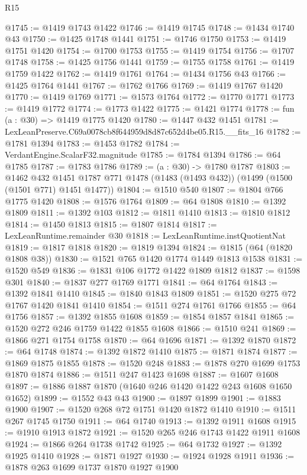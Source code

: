 \begin{lexlean}{R15}
\begin{coremodule}
@1745 := @1419 @1743 @1422
@1746 := @1419 @1745
@1748 := @1434 @1740 @43
@1750 := @1425 @1748 @1441
@1751 := @1746 @1750
@1753 := @1419 @1751 @1420
@1754 := @1700 @1753
@1755 := @1419 @1754
@1756 := @1707 @1748
@1758 := @1425 @1756 @1441
@1759 := @1755 @1758
@1761 := @1419 @1759 @1422
@1762 := @1419 @1761
@1764 := @1434 @1756 @43
@1766 := @1425 @1764 @1441
@1767 := @1762 @1766
@1769 := @1419 @1767 @1420
@1770 := @1419 @1769
@1771 := @1573 @1764
@1772 := @1770 @1771
@1773 := @1419 @1772
@1774 := @1773 @1422
@1775 := @1421 @1774
@1778 := fun (a : @30) => @1419 @1775 @1420
@1780 := @1447 @432 @1451
@1781 := LexLeanPreserve.C69a0078cb8f644959d8d87c652d4be05.R15.__fits_16
@1782 := @1781 @1394
@1783 := @1453 @1782
@1784 := VerdantEngine.ScalarF32.magnitude
@1785 := @1784 @1394
@1786 := @64 @1785
@1787 := @1783 @1786
@1789 := (a : @30) -> @1780 @1787
@1803 := @1462
    @432
    @1451
    @1787
    @771
    @1478
    (@1483 (@1493 @432))
    (@1499 (@1500 (@1501 @771) @1451 @1477))
@1804 := @1510 @540
@1807 := @1804 @766 @1775 @1420
@1808 := @1576 @1764
@1809 := @64 @1808
@1810 := @1392 @1809
@1811 := @1392 @103
@1812 := @1811 @1410
@1813 := @1810 @1812
@1814 := @1450 @1813
@1815 := @1807 @1814
@1817 := LexLeanRuntime.remainder @30
@1818 := LexLeanRuntime.instQuotientNat
@1819 := @1817 @1818
@1820 := @1819 @1394
@1824 := @1815 (@64 (@1820 @1808 @38))
@1830 := @1521 @765 @1420 @1774 @1449 @1813 @1538
@1831 := @1520 @549
@1836 := @1831 @106 @1772 @1422 @1809 @1812
@1837 := @1598 @301
@1840 := @1837 @277 @1769 @1771
@1841 := @64 @1764
@1843 := @1392 @1841 @1410
@1845 := @1840 @1843 @1809
@1851 := @1520 @275 @72 @1767 @1420 @1841 @1410
@1854 := @1511 @274 @1761 @1766
@1855 := @64 @1756
@1857 := @1392 @1855 @1608
@1859 := @1854 @1857 @1841
@1865 := @1520 @272 @246 @1759 @1422 @1855 @1608
@1866 := @1510 @241
@1869 := @1866 @271 @1754 @1758
@1870 := @64 @1696
@1871 := @1392 @1870
@1872 := @64 @1748
@1874 := @1392 @1872 @1410
@1875 := @1871 @1874
@1877 := @1869 @1875 @1855
@1878 := @1520 @248
@1883 := @1878 @270 @1699 @1753 @1870 @1874
@1886 := @1511 @247 @1423 @1698
@1887 := @1607 @1608
@1897 := @1886 @1887 @1870 (@1640 @246 @1420 @1422 @243 @1608 @1650 @1652)
@1899 := @1552 @43 @43
@1900 := @1897 @1899
@1901 := @1883 @1900
@1907 := @1520 @268 @72 @1751 @1420 @1872 @1410
@1910 := @1511 @267 @1745 @1750
@1911 := @64 @1740
@1913 := @1392 @1911 @1608
@1915 := @1910 @1913 @1872
@1921 := @1520 @265 @246 @1743 @1422 @1911 @1608
@1924 := @1866 @264 @1738 @1742
@1925 := @64 @1732
@1927 := @1392 @1925 @1410
@1928 := @1871 @1927
@1930 := @1924 @1928 @1911
@1936 := @1878 @263 @1699 @1737 @1870 @1927 @1900

\end{coremodule}
\end{lexlean}

